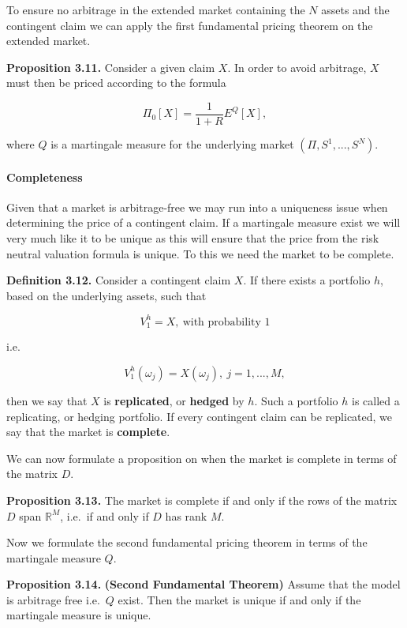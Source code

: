 \documentclass[
]{article}
\begin{document}
To ensure no arbitrage in the extended market containing the \(N\)
assets and the contingent claim we can apply the first fundamental
pricing theorem on the extended market.

\textbf{Proposition 3.11.} Consider a given claim \(X\). In order to
avoid arbitrage, \(X\) must then be priced according to the formula

\[
\Pi_0[X]=\frac{1}{1+R}E^Q[X],\tag{3.10}
\]

where \(Q\) is a martingale measure for the underlying market
\((\Pi,S^1,...,S^N)\).

\hypertarget{completeness}{%
\paragraph{Completeness}\label{completeness}}

Given that a market is arbitrage-free we may run into a uniqueness issue
when determining the price of a contingent claim. If a martingale
measure exist we will very much like it to be unique as this will ensure
that the price from the risk neutral valuation formula is unique. To
this we need the market to be complete.

\textbf{Definition 3.12.} Consider a contingent claim \(X\). If there
exists a portfolio \(h\), based on the underlying assets, such that

\[
V_1^h=X,\ \text{with probability 1}\tag{3.11}
\]

i.e.

\[
V_1^h(\omega_j)=X(\omega_j),\ j=1,...,M,\tag{3.12}
\]

then we say that \(X\) is \textbf{replicated}, or \textbf{hedged} by
\(h\). Such a portfolio \(h\) is called a replicating, or hedging
portfolio. If every contingent claim can be replicated, we say that the
market is \textbf{complete}.

We can now formulate a proposition on when the market is complete in
terms of the matrix \(D\).

\textbf{Proposition 3.13.} The market is complete if and only if the
rows of the matrix \(D\) span \(\mathbb{R}^M\), i.e.~if and only if
\(D\) has rank \(M\).

Now we formulate the second fundamental pricing theorem in terms of the
martingale measure \(Q\).

\textbf{Proposition 3.14.} \textbf{(Second Fundamental Theorem)} Assume
that the model is arbitrage free i.e.~\(Q\) exist. Then the market is
unique if and only if the martingale measure is unique.
\end{document}
